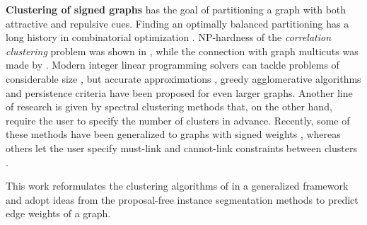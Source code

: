 \textbf{Clustering of signed graphs} has the goal of partitioning a graph with both attractive and repulsive cues. Finding an optimally balanced partitioning has a long history in combinatorial optimization \cite{grotschel1989cutting,grotschel1990facets,chopra1993partition}. %
NP-hardness of the \emph{correlation clustering} problem was shown in \cite{bansal2004correlation}, while the connection with graph multicuts was made by \cite{demaine2006correlation}. Modern integer linear programming solvers can tackle problems of considerable size \cite{andres2012globally}, but accurate approximations \cite{pape2017solving,beier2016efficient,yarkony2012fast}, greedy agglomerative algorithms \cite{levinkov2017comparative,wolf2019mutex,keuper2015efficient,kardoostsolving} and persistence criteria \cite{lange2018partial,lange2018combinatorial} have been proposed for even larger graphs. 
Another line of research is given by spectral clustering methods that, on the other hand, require the user to specify the number of clusters in advance. Recently, some of these methods have been generalized to graphs with signed weights \cite{Cucuringu2019SPONGEAG,chiang2012scalable,kunegis2010spectral}, whereas others let the user specify must-link and cannot-link constraints between clusters \cite{rangapuram2012constrained,wang2014constrained,cucuringu2016simple}.

This work reformulates the clustering algorithms of \cite{levinkov2017comparative,wolf2018mutex,keuper2015efficient} in a generalized framework and adopt ideas from the proposal-free instance segmentation methods \cite{liu2018affinity,wolf2018mutex,lee2017superhuman} to predict edge weights of a graph.

